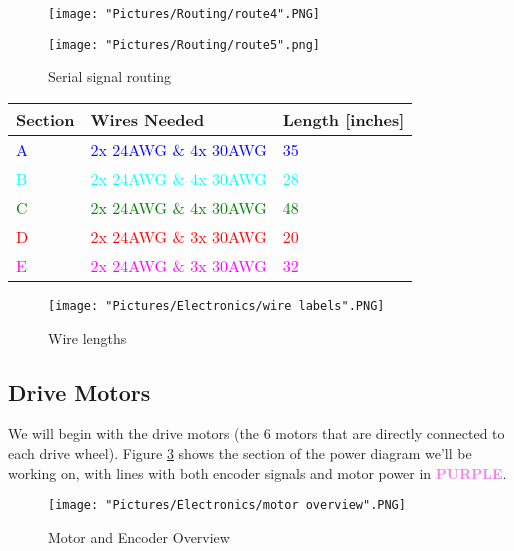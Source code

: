 \documentclass[12pt]{article}
\begin{document}
\begin{figure}[H]
 	\centering
  	\begin{minipage}[b]{0.48\textwidth}
		\texttt{[image: "Pictures/Routing/route4".PNG]}
  	\end{minipage}
  	\hfill
  	\begin{minipage}[b]{0.42\textwidth}
    		\texttt{[image: "Pictures/Routing/route5".png]}
  	\end{minipage}
	\caption{Serial signal routing}
	\label{ss2rc2}
\end{figure}




\begin{tabular}[3] {| p{2cm} | p{7cm} | p{4cm} |}
	\hline
	\textbf{Section} & \textbf{Wires Needed} & \textbf{Length [inches]}  \\ \hline
	\textcolor{blue}{A} & \textcolor{blue}{2x 24AWG \& 4x 30AWG} & \textcolor{blue}{35} \\ \hline
	\textcolor{cyan}{B} & \textcolor{cyan}{2x 24AWG \& 4x 30AWG} & \textcolor{cyan}{28} \\ \hline
	\textcolor{green}{C} & \textcolor{green}{2x 24AWG \& 4x 30AWG} & \textcolor{green}{48} \\ \hline
	\textcolor{red}{D} & \textcolor{red}{2x 24AWG \& 3x 30AWG} & \textcolor{red}{20} \\ \hline
	\textcolor{magenta}{E} & \textcolor{magenta}{2x 24AWG \& 3x 30AWG} & \textcolor{magenta}{32} \\ \hline
\end{tabular}

\begin{figure}[H]
 	\centering
	\texttt{[image: "Pictures/Electronics/wire labels".PNG]}
 	\caption{Wire lengths}
	\label{wire lengths}
\end{figure}

\subsection{Drive Motors}
We will begin with the drive motors (the 6 motors that are directly connected to each drive wheel). Figure \ref{motors over} shows the section of the power diagram we'll be working on, with lines with both encoder signals and motor power in \textcolor{violet}{\textbf{PURPLE}}.

\begin{figure}[H]
  	\centering
    	\texttt{[image: "Pictures/Electronics/motor overview".PNG]}
 	\caption{Motor and Encoder Overview}
	\label{motors over}
\end{figure}
\end{document}

